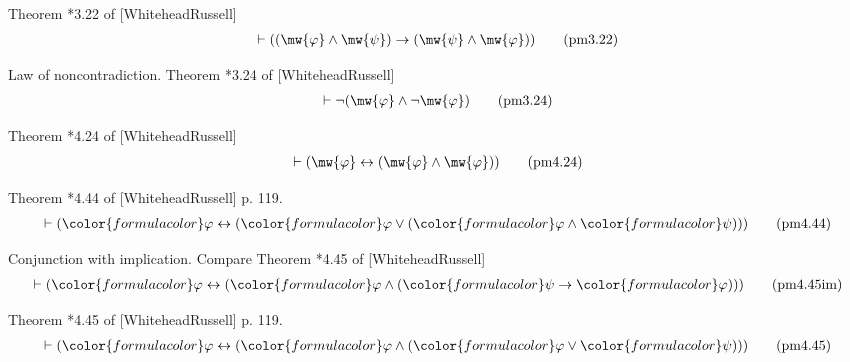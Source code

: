 \begin{lemma} {Theorem *3.22 of [WhiteheadRussell]}
\begin{align}
\vdash ( ( \mw{\varphi} \wedge \mw{\psi} ) \rightarrow ( \mw{\psi} \wedge
    \mw{\varphi} ) )\label{eq:pm3.22}\tag{pm3.22}
\end{align}
\end{lemma}


\begin{lemma} {Law of noncontradiction.  Theorem *3.24 of
[WhiteheadRussell]}
\begin{align}
\vdash \lnot ( \mw{\varphi} \wedge \lnot \mw{\varphi}
    )\label{eq:pm3.24}\tag{pm3.24}
\end{align}
\end{lemma}


\begin{lemma} {Theorem *4.24 of [WhiteheadRussell]}
\begin{align}
\vdash ( \mw{\varphi} \leftrightarrow ( \mw{\varphi} \wedge \mw{\varphi} )
    )\label{eq:pm4.24}\tag{pm4.24}
\end{align}
\end{lemma}


\begin{lemma} {Theorem *4.44 of [WhiteheadRussell]} p. 119. 
\begin{align}
\vdash ( {\color{formulacolor}\varphi} \leftrightarrow (
    {\color{formulacolor}\varphi} \vee ( {\color{formulacolor}\varphi} \wedge
    {\color{formulacolor}\psi} ) ) )\label{eq:pm4.44}\tag{pm4.44}
\end{align}
\end{lemma}


\begin{lemma} {Conjunction with implication.}  Compare
Theorem *4.45 of [WhiteheadRussell]
\begin{align}
\vdash ( {\color{formulacolor}\varphi} \leftrightarrow (
    {\color{formulacolor}\varphi} \wedge ( {\color{formulacolor}\psi}
    \rightarrow {\color{formulacolor}\varphi} ) ) )\label{eq:pm4.45im}\tag{pm4.45im}
\end{align}
\end{lemma}


\begin{lemma} {Theorem *4.45 of [WhiteheadRussell]} p. 119. 
\begin{align}
\vdash ( {\color{formulacolor}\varphi} \leftrightarrow (
    {\color{formulacolor}\varphi} \wedge ( {\color{formulacolor}\varphi} \vee
    {\color{formulacolor}\psi} ) ) )\label{eq:pm4.45}\tag{pm4.45}
\end{align}
\end{lemma}



